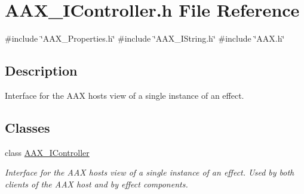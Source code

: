 \hypertarget{a00575}{}\section{A\+A\+X\+\_\+\+I\+Controller.\+h File Reference}
\label{a00575}
{\ttfamily \#include \char`\"{}A\+A\+X\+\_\+\+Properties.\+h\char`\"{}}\newline
{\ttfamily \#include \char`\"{}A\+A\+X\+\_\+\+I\+String.\+h\char`\"{}}\newline
{\ttfamily \#include \char`\"{}A\+A\+X.\+h\char`\"{}}\newline


\subsection{Description}
Interface for the A\+AX host\textquotesingle{}s view of a single instance of an effect. 

\subsection*{Classes}
\begin{DoxyCompactItemize}
\item 
class \mbox{\hyperlink{a01789}{A\+A\+X\+\_\+\+I\+Controller}}
\begin{DoxyCompactList}\small\item\em Interface for the A\+AX host\textquotesingle{}s view of a single instance of an effect. Used by both clients of the A\+AX host and by effect components. \end{DoxyCompactList}\end{DoxyCompactItemize}

